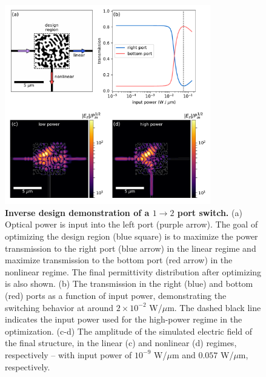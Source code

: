 \begin{figure}[!ht]
\centering
\includegraphics[width=0.8\textwidth]{figures/angler_T_port_11_1.pdf}
\caption{\label{fig:t_port} \textbf{Inverse design demonstration of a $1 \to 2$ port switch.}  (a) Optical power is input into the left port (purple arrow). The goal of optimizing the design region (blue square) is to maximize the power transmission to the right port (blue arrow) in the linear regime and maximize transmission to the bottom port (red arrow) in the nonlinear regime. The final permittivity distribution after optimizing is also shown. (b) The transmission in the right (blue) and bottom (red) ports as a function of input power, demonstrating the switching behavior at around $2\times10^{-2}$ W/$\mu$m.  The dashed black line indicates the input power used for the high-power regime in the optimization. (c-d) The amplitude of the simulated electric field of the final structure, in the linear (c) and nonlinear (d) regimes, respectively -- with input power of $10^{-9}$ W/$\mu$m and $0.057$ W/$\mu$m, respectively.}
\end{figure}

